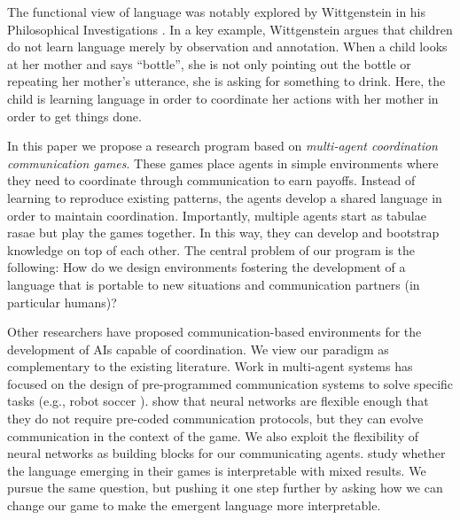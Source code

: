 The functional view of language was notably explored by Wittgenstein in his Philosophical Investigations \citep{Wittgenstein:1953}. In a key example, Wittgenstein argues that children do not learn language merely by observation and annotation. When a child looks at her mother and says ``bottle'', she is not only pointing out the bottle or repeating her mother’s utterance, she is asking for something to drink. Here, the child is learning language in order to coordinate her actions with her mother in order to get things done.

In this paper we propose a research program based on
\textit{multi-agent coordination communication games}. These games
place agents in simple environments where they need to coordinate
through communication to earn payoffs. Instead of learning to
reproduce existing patterns, the agents develop a shared language in
order to maintain coordination. Importantly, multiple agents start as
tabulae rasae but play the games together. In this way, they can
develop and bootstrap knowledge on top of each other. The central
problem of our program is the following: How do we design environments
fostering the development of a language that is portable to new
situations and communication partners (in particular
humans)? %

Other researchers have proposed communication-based environments for
the development of AIs capable of coordination. We view our paradigm
as complementary to the existing
literature. %
Work in multi-agent systems has focused on the design of
pre-programmed communication systems to solve specific tasks (e.g.,
robot soccer \citep{stone1998towards}). \cite{sukhbaatar2016learning}
show that neural networks are flexible enough that they do not require
pre-coded communication protocols, but they can evolve communication
in the context of the game.%
  We also
exploit the flexibility of neural networks as building blocks for our
communicating agents. \cite{sukhbaatar2016learning} study whether the
language emerging in their games is interpretable with mixed
results. We pursue the same question, but pushing it one step further
by asking how we can change our game to make the emergent language
more interpretable.

